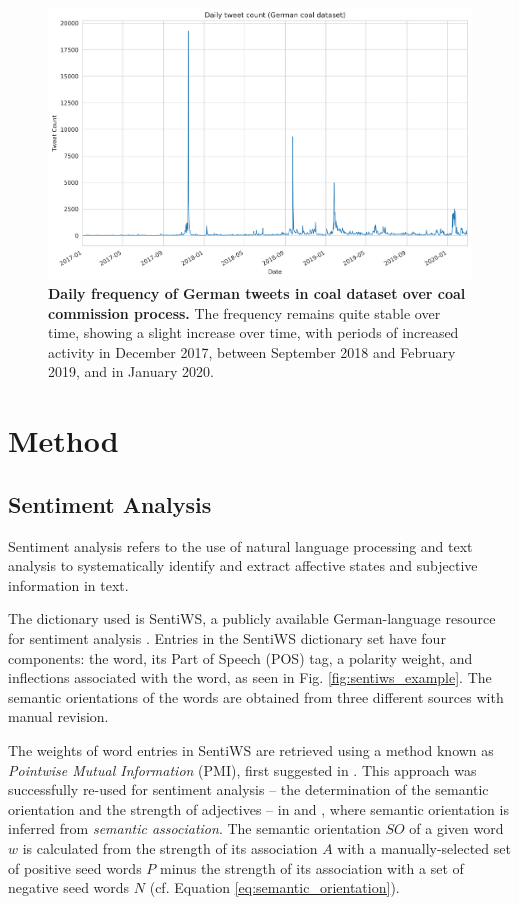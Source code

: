 \documentclass[12pt,onecolumn,twoside]{layout}
\begin{document}
\begin{figure}
	\begin{center}
		\includegraphics[width=0.9\linewidth]{figures/sa_tweet_frequency_zoom4}
	\end{center}
	\caption{\textbf{Daily frequency of German tweets in coal dataset over coal commission process.} The frequency remains quite stable over time, showing a slight increase over time, with periods of increased activity in December 2017, between September 2018 and February 2019, and in January 2020.}
	\label{fig:tweet_frequency}
\end{figure}

\section{Method} \label{sec:method}
\subsection*{Sentiment Analysis}

Sentiment analysis refers to the use of natural language processing and text analysis to systematically identify and extract affective states and subjective information in text. %

The dictionary used is SentiWS, a publicly available German-language resource for sentiment analysis \citep{REMUS10.490}. Entries in the SentiWS dictionary set have four components: the word, its Part of Speech (POS) tag, a polarity weight, and inflections associated with the word, as seen in Fig. \ref{fig:sentiws_example}. The semantic orientations of the words are obtained from three different sources with manual revision.

The weights of word entries in SentiWS are retrieved using a method known as \emph{Pointwise Mutual Information} (PMI), first suggested in \citep{church-hanks-1990-word}. This approach was successfully re-used for sentiment analysis -- the determination of the semantic orientation and the strength of adjectives -- in \citep{Turney2002} and \citep{Turney2003}, where semantic orientation is inferred from \emph{semantic association}. The semantic orientation \(SO\) of a given word \(w\) is calculated from the strength of its association \(A\) with a manually-selected set of positive seed words \(P\) minus the strength of its association with a set of negative seed words \(N\) (cf. Equation \ref{eq:semantic_orientation}).
\end{document}
